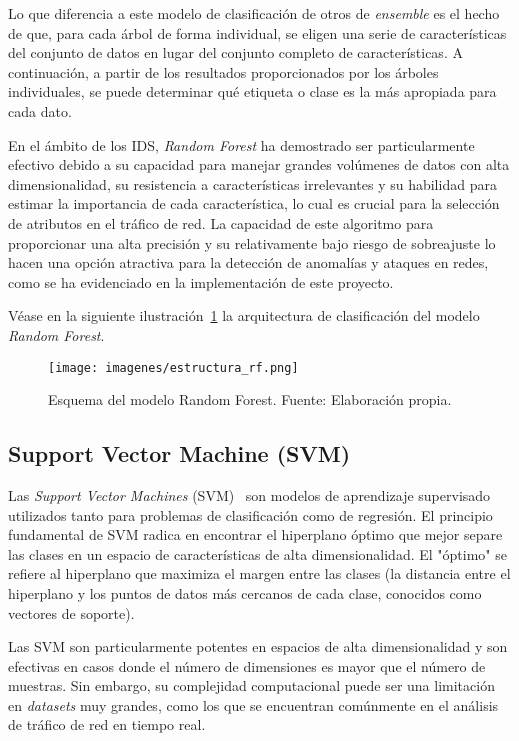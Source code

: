 Lo que diferencia a este modelo de clasificación de otros de \textit{ensemble} es el hecho de que, para cada árbol de forma individual, se eligen una serie de características del conjunto de datos en lugar del conjunto completo de características. A continuación, a partir de los resultados proporcionados por los árboles individuales, se puede determinar qué etiqueta o clase es la más apropiada para cada dato.

En el ámbito de los IDS, \textit{Random Forest} ha demostrado ser particularmente efectivo debido a su capacidad para manejar grandes volúmenes de datos con alta dimensionalidad, su resistencia a características irrelevantes y su habilidad para estimar la importancia de cada característica, lo cual es crucial para la selección de atributos en el tráfico de red. La capacidad de este algoritmo para proporcionar una alta precisión y su relativamente bajo riesgo de sobreajuste lo hacen una opción atractiva para la detección de anomalías y ataques en redes, como se ha evidenciado en la implementación de este proyecto.

Véase en la siguiente ilustración~\ref{Fig.RandomForest} la arquitectura de clasificación del modelo \textit{Random Forest}.

\begin{figure}[ht!]
  \centering
  \texttt{[image: imagenes/estructura\_rf.png]}
  \caption{Esquema del modelo Random Forest. Fuente: Elaboración propia.}
  \label{Fig.RandomForest}
\end{figure}


\subsection{Support Vector Machine (SVM)}
Las \textit{Support Vector Machines} (SVM)~\cite{aljamal2019hybridIDS} son modelos de aprendizaje supervisado utilizados tanto para problemas de clasificación como de regresión. El principio fundamental de SVM radica en encontrar el hiperplano óptimo que mejor separe las clases en un espacio de características de alta dimensionalidad. El "óptimo" se refiere al hiperplano que maximiza el margen entre las clases (la distancia entre el hiperplano y los puntos de datos más cercanos de cada clase, conocidos como vectores de soporte).

Las SVM son particularmente potentes en espacios de alta dimensionalidad y son efectivas en casos donde el número de dimensiones es mayor que el número de muestras. Sin embargo, su complejidad computacional puede ser una limitación en \textit{datasets} muy grandes, como los que se encuentran comúnmente en el análisis de tráfico de red en tiempo real.

